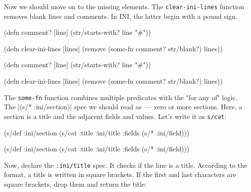 
Now we should move on to the missing elements. The \verb|clear-ini-lines| function removes blank lines and comments. In INI, the latter begin with a pound sign.

\ifx\DEVICETYPE\MOBILE

\begin{english}
  \begin{clojure}
(defn comment? [line]
  (str/starts-with? line "#"))

(defn clear-ini-lines [lines]
  (remove
    (some-fn comment? str/blank?) lines))
  \end{clojure}
\end{english}

\else

\begin{english}
  \begin{clojure}
(defn comment? [line]
  (str/starts-with? line "#"))

(defn clear-ini-lines [lines]
  (remove (some-fn comment? str/blank?) lines))
  \end{clojure}
\end{english}

\fi


The \verb|some-fn| function combines multiple predicates with the "for any of" logic. The \spverb|(s/* :ini/section)| spec we should read as~--- zero or more sections. Here, a section is a title and the adjacent fields and values. Let's write it as \verb|s/cat|:

\ifx\DEVICETYPE\MOBILE

\begin{english}
  \begin{clojure}
(s/def :ini/section
  (s/cat :title
    :ini/title :fields (s/* :ini/field)))
  \end{clojure}
\end{english}

\else

\begin{english}
  \begin{clojure}
(s/def :ini/section
  (s/cat :title :ini/title :fields (s/* :ini/field)))
  \end{clojure}
\end{english}

\fi

Now, declare the \verb|:ini/title| spec. It checks if the line is a title. According to the format, a title is written in square brackets. If the first and last characters are square brackets, drop them and return the title:

